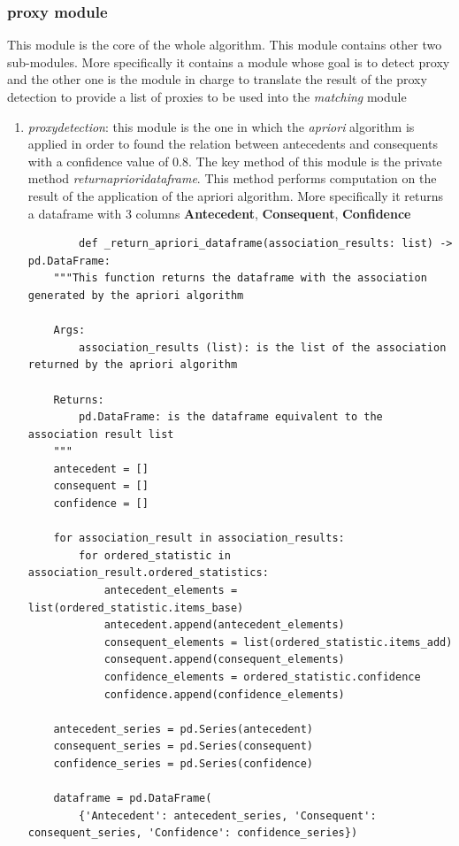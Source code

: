 \documentclass[12pt,a4paper,openright,twoside]{book}
\begin{document}
\subsubsection{proxy module}
This module is the core of the whole algorithm. This module contains other two sub-modules. More specifically it contains a module whose goal is to detect proxy and the other one is the module in charge to translate the result of the proxy detection to provide a list of proxies to be used into the \emph{matching} module
\begin{enumerate}
    \item \emph{proxy\textunderscore detection}: this module is the one in which the \emph{apriori} algorithm is applied in order to found the relation between antecedents and consequents with a confidence value of 0.8. The key method of this module is the private method \emph{\textunderscore return\textunderscore apriori\textunderscore dataframe}. This method performs computation on the result of the application of the apriori algorithm. More specifically it returns a dataframe with 3 columns \textbf{Antecedent}, \textbf{Consequent}, \textbf{Confidence} 

    \begin{lstlisting}
        def _return_apriori_dataframe(association_results: list) -> pd.DataFrame:
    """This function returns the dataframe with the association generated by the apriori algorithm

    Args:
        association_results (list): is the list of the association returned by the apriori algorithm

    Returns:
        pd.DataFrame: is the dataframe equivalent to the association result list
    """
    antecedent = []
    consequent = []
    confidence = []

    for association_result in association_results:
        for ordered_statistic in association_result.ordered_statistics:
            antecedent_elements = list(ordered_statistic.items_base)
            antecedent.append(antecedent_elements)
            consequent_elements = list(ordered_statistic.items_add)
            consequent.append(consequent_elements)
            confidence_elements = ordered_statistic.confidence
            confidence.append(confidence_elements)

    antecedent_series = pd.Series(antecedent)
    consequent_series = pd.Series(consequent)
    confidence_series = pd.Series(confidence)

    dataframe = pd.DataFrame(
        {'Antecedent': antecedent_series, 'Consequent': consequent_series, 'Confidence': confidence_series})


\end{lstlisting}
\end{enumerate}
\end{document}
